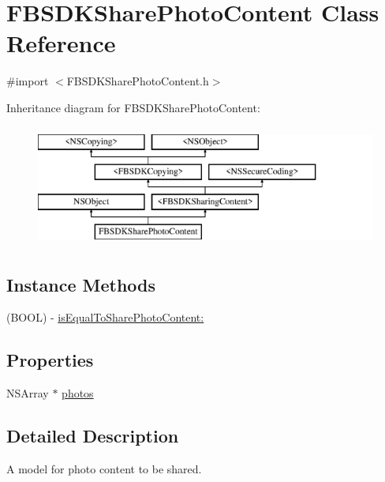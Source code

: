 \hypertarget{interface_f_b_s_d_k_share_photo_content}{}\section{F\+B\+S\+D\+K\+Share\+Photo\+Content Class Reference}
\label{interface_f_b_s_d_k_share_photo_content}


{\ttfamily \#import $<$F\+B\+S\+D\+K\+Share\+Photo\+Content.\+h$>$}

Inheritance diagram for F\+B\+S\+D\+K\+Share\+Photo\+Content\+:\begin{figure}[H]
\begin{center}
\leavevmode
\includegraphics[height=4.000000cm]{interface_f_b_s_d_k_share_photo_content}
\end{center}
\end{figure}
\subsection*{Instance Methods}
\begin{DoxyCompactItemize}
\item 
(B\+O\+O\+L) -\/ \hyperlink{interface_f_b_s_d_k_share_photo_content_ace81b33c5411764eaa3fe442f533c34f}{is\+Equal\+To\+Share\+Photo\+Content\+:}
\end{DoxyCompactItemize}
\subsection*{Properties}
\begin{DoxyCompactItemize}
\item 
N\+S\+Array $\ast$ \hyperlink{interface_f_b_s_d_k_share_photo_content_a25922cdf4c382a13ebc748c8f2b0eba3}{photos}
\end{DoxyCompactItemize}


\subsection{Detailed Description}
A model for photo content to be shared. 

